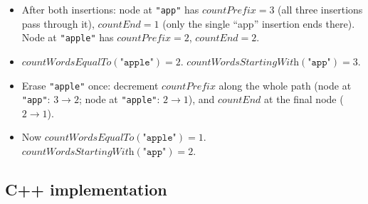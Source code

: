 \begin{itemize}
  \item After both insertions: node at \texttt{"app"} has
        $\textit{countPrefix}=3$ (all three insertions pass through
        it), $\textit{countEnd}=1$ (only the single ``app'' insertion
        ends there). Node at \texttt{"apple"} has
        $\textit{countPrefix}=2$, $\textit{countEnd}=2$.
  \item $\textit{countWordsEqualTo}(\texttt{"apple"}) = 2$.
        $\textit{countWordsStartingWith}(\texttt{"app"}) = 3$.
  \item Erase \texttt{"apple"} once: decrement $\textit{countPrefix}$
        along the whole path (node at \texttt{"app"}: $3\to2$; node at
        \texttt{"apple"}: $2\to1$), and $\textit{countEnd}$ at the final
        node ($2\to1$).
  \item Now $\textit{countWordsEqualTo}(\texttt{"apple"}) = 1$.
        $\textit{countWordsStartingWith}(\texttt{"app"}) = 2$.
\end{itemize}

\subsection*{C++ implementation}

